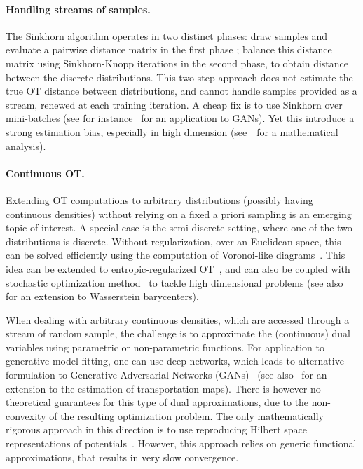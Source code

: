 \paragraph{Handling streams of samples.} The Sinkhorn algorithm operates in two distinct phases: draw samples and
evaluate a pairwise distance matrix in the first phase ; balance this distance
matrix using Sinkhorn-Knopp iterations in the second phase, to obtain distance
between the discrete distributions. This two-step approach does not estimate the
true OT distance between distributions, and cannot handle samples provided as a
stream, renewed at each training iteration. A cheap fix is to use Sinkhorn over
mini-batches (see for instance~\citet{2018-Genevay-aistats} for an application to
GANs). Yet this introduce a strong estimation bias, especially in
high dimension (see~\citet{fatras2019learning} for a mathematical analysis). 

\paragraph{Continuous OT.} Extending OT computations to arbitrary distributions
(possibly having continuous densities) without relying on a fixed a priori
sampling is an emerging topic of interest. A special case is the semi-discrete
setting, where one of the two distributions is discrete. Without regularization,
over an Euclidean space, this can be solved efficiently using the computation of
Voronoi-like diagrams~\cite{merigot2011multiscale}. This idea can be extended to
entropic-regularized OT~\cite{cuturi2018semidual}, and can also be coupled with
stochastic optimization method~\cite{2016-genevay-nips} to tackle high
dimensional problems (see also~\citet{staib2017parallel} for an extension to Wasserstein barycenters). 

When dealing with arbitrary continuous densities, which are accessed through a
stream of random sample, the challenge is to approximate  the (continuous) dual
variables using parametric or non-parametric functions. For application to
generative model fitting, one can use deep networks, which leads to alternative
formulation to Generative Adversarial Networks (GANs)~\cite{arjovsky2017wgan}
(see also~\citet{seguy2018large} for an extension to the estimation of
transportation maps). There is however no theoretical guarantees for this type
of dual approximations, due to the non-convexity of the resulting optimization
problem. The only mathematically rigorous approach in this direction is to use
reproducing Hilbert space representations of
potentials~\cite{2016-genevay-nips}. However, this approach relies on generic functional
approximations, that results in very slow convergence.


